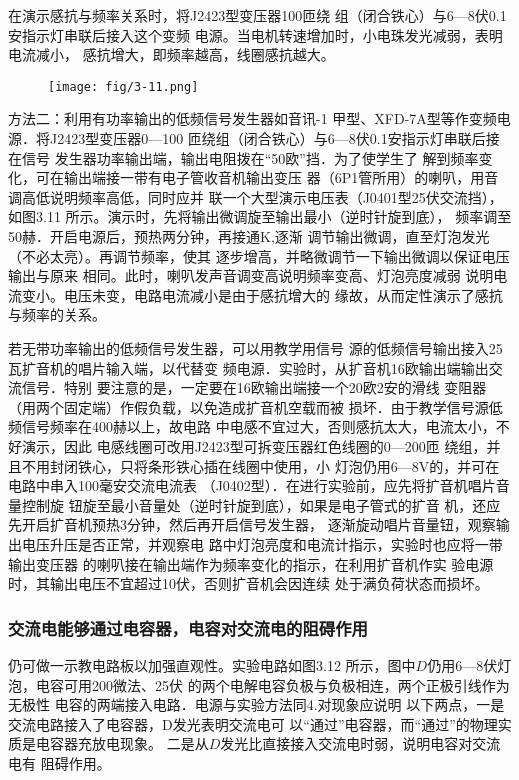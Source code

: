 在演示感抗与频率关系时，将J2423型变压器100匝绕
组（闭合铁心）与6—8伏0.1安指示灯串联后接入这个变频
电源。当电机转速增加时，小电珠发光减弱，表明电流减小，
感抗增大，即频率越高，线圈感抗越大。

\begin{figure}[htp]
    \centering
\texttt{[image: fig/3-11.png]}
    \caption{}
\end{figure}

方法二：利用有功率输出的低频信号发生器如音讯-1
甲型、XFD-7A型等作变频电源．将J2423型变压器0—100
匝绕组（闭合铁心）与6—8伏0.1安指示灯串联后接在信号
发生器功率输出端，输出电阻拨在“50欧”挡．为了使学生了
解到频率变化，可在输出端接一带有电子管收音机输出变压
器（6P1管所用）的喇叭，用音调高低说明频率高低，同时应并
联一个大型演示电压表（J0401型25伏交流挡），如图3.11
所示。演示时，先将输出微调旋至输出最小（逆时针旋到底），
频率调至50赫．开启电源后，预热两分钟，再接通K,逐渐
调节输出微调，直至灯泡发光（不必太亮）。再调节频率，使其
逐步增高，并略微调节一下输出微调以保证电压输出与原来
相同。此时，喇叭发声音调变高说明频率变高、灯泡亮度减弱
说明电流变小。电压未变，电路电流减小是由于感抗增大的
缘故，从而定性演示了感抗与频率的关系。

若无带功率输出的低频信号发生器，可以用教学用信号
源的低频信号输出接入25瓦扩音机的唱片输入端，以代替变
频电源．实验时，从扩音机16欧输出端输出交流信号．特别
要注意的是，一定要在16欧输出端接一个20欧2安的滑线
变阻器（用两个固定端）作假负载，以免造成扩音机空载而被
损坏．由于教学信号源低频信号频率在400赫以上，故电路
中电感不宜过大，否则感抗太大，电流太小，不好演示，因此
电感线圈可改用J2423型可拆变压器红色线圈的0—200匝
绕组，并且不用封闭铁心，只将条形铁心插在线圈中使用，小
灯泡仍用6—8V的，并可在电路中串入100毫安交流电流表
（J0402型）．在进行实验前，应先将扩音机唱片音量控制旋
钮旋至最小音量处（逆时针旋到底），如果是电子管式的扩音
机，还应先开启扩音机预热3分钟，然后再开启信号发生器，
逐渐旋动唱片音量钮，观察输出电压升压是否正常，并观察电
路中灯泡亮度和电流计指示，实验时也应将一带输出变压器
的喇叭接在输出端作为频率变化的指示，在利用扩音机作实
验电源时，其输出电压不宜超过10伏，否则扩音机会因连续
处于满负荷状态而损坏。

\subsubsection{交流电能够通过电容器，电容对交流电的阻碍作用}
仍可做一示教电路板以加强直观性。实验电路如图3.12
所示，图中$D$仍用6—8伏灯泡，电容可用200微法、25伏
的两个电解电容负极与负极相连，两个正极引线作为无极性
电容的两端接入电路．电源与实验方法同4.对现象应说明
以下两点，一是交流电路接入了电容器，D发光表明交流电可
以“通过”电容器，而“通过”的物理实质是电容器充放电现象。
二是从$D$发光比直接接入交流电时弱，说明电容对交流电有
阻碍作用。


